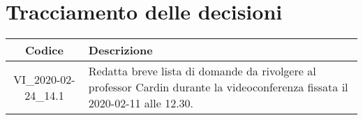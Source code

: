 \section*{Tracciamento delle decisioni}

\begin{center}
	\begin{longtable}{|c|p{12.25cm}|}
	\hline
	\rowcolor{lighter-grayer}
	\textbf{Codice} & \textbf{Descrizione} \\
	\hline
	\endfirsthead
	
	\hline
		VI\_2020-02-24\_14.1 & Redatta breve lista di domande da rivolgere al professor Cardin durante la videoconferenza fissata il 2020-02-11 alle 12.30. \\
	\hline

	\end{longtable}
\end{center}